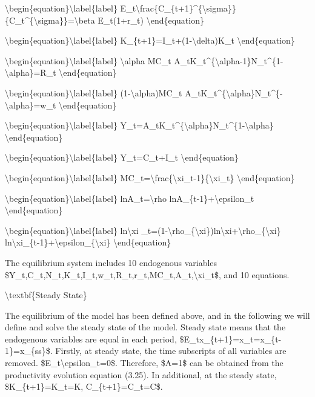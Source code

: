 \documentclass[10pt,math=newtx,citestyle=gb7714-2015,bibstyle=gb7714-2015]{elegantbook}
\begin{document}
	\textbackslash{}begin\{equation\}\textbackslash{}label\{label\}
	E\_t\textbackslash{}frac\{C\_\{t+1\}\^{}\{\textbackslash{}sigma\}\}\{C\_t\^{}\{\textbackslash{}sigma\}\}=\textbackslash{}beta E\_t(1+r\_t)
	\textbackslash{}end\{equation\}
	
	\textbackslash{}begin\{equation\}\textbackslash{}label\{label\}
	K\_\{t+1\}=I\_t+(1-\textbackslash{}delta)K\_t
	\textbackslash{}end\{equation\}
	
	\textbackslash{}begin\{equation\}\textbackslash{}label\{label\}
	\textbackslash{}alpha MC\_t A\_tK\_t\^{}\{\textbackslash{}alpha-1\}N\_t\^{}\{1-\textbackslash{}alpha\}=R\_t
	\textbackslash{}end\{equation\}
	
	\textbackslash{}begin\{equation\}\textbackslash{}label\{label\}
	(1-\textbackslash{}alpha)MC\_t A\_tK\_t\^{}\{\textbackslash{}alpha\}N\_t\^{}\{-\textbackslash{}alpha\}=w\_t
	\textbackslash{}end\{equation\}
	
	\textbackslash{}begin\{equation\}\textbackslash{}label\{label\}
	Y\_t=A\_tK\_t\^{}\{\textbackslash{}alpha\}N\_t\^{}\{1-\textbackslash{}alpha\}
	\textbackslash{}end\{equation\}
	
	\textbackslash{}begin\{equation\}\textbackslash{}label\{label\}
	Y\_t=C\_t+I\_t
	\textbackslash{}end\{equation\}
	
	\textbackslash{}begin\{equation\}\textbackslash{}label\{label\}
	MC\_t=\textbackslash{}frac\{\textbackslash{}xi\_t-1\}\{\textbackslash{}xi\_t\}
	\textbackslash{}end\{equation\}
	
	\textbackslash{}begin\{equation\}\textbackslash{}label\{label\}
	lnA\_t=\textbackslash{}rho lnA\_\{t-1\}+\textbackslash{}epsilon\_t
	\textbackslash{}end\{equation\}
	
	\textbackslash{}begin\{equation\}\textbackslash{}label\{label\}
	ln\textbackslash{}xi \_t=(1-\textbackslash{}rho\_\{\textbackslash{}xi\})ln\textbackslash{}xi+\textbackslash{}rho\_\{\textbackslash{}xi\} ln\textbackslash{}xi\_\{t-1\}+\textbackslash{}epsilon\_\{\textbackslash{}xi\}
	\textbackslash{}end\{equation\}
	
	The equilibrium system includes 10 endogenous variables \$Y\_t,C\_t,N\_t,K\_t,I\_t,w\_t,R\_t,r\_t,MC\_t,A\_t,\textbackslash{}xi\_t\$, and 10 equations.
	
	
	\textbackslash{}textbf\{Steady State\}
	
	The equilibrium of the model has been defined above, and in the following we will define and solve the steady state of the model. Steady state means that the endogenous variables are equal in each period, \$E\_tx\_\{t+1\}=x\_t=x\_\{t-1\}=x\_\{ss\}\$. Firstly, at steady state, the time subscripts of all variables are removed. \$E\_t\textbackslash{}epsilon\_t=0\$. Therefore, \$A=1\$ can be obtained from the productivity evolution equation (3.25). In additional, at the steady state, \$K\_\{t+1\}=K\_t=K, C\_\{t+1\}=C\_t=C\$.
	
\end{document}
